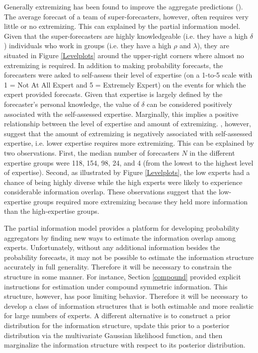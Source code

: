 \documentclass[11pt]{article}
\theoremstyle{definition}
\theoremstyle{definition}
\begin{document}
Generally extremizing has been found to improve the aggregate predictions (\cite{mellers}). The average forecast of a team of super-forecasters, however, often requires very little or no extremizing. This can explained by the partial information model. Given that the  super-forecasters are highly knowledgeable (i.e. they have a high $\delta$) individuals who work in groups (i.e. they have a high $\rho$ and $\lambda$), they are situated in Figure \ref{Levelplots} around the upper-right corners where almost no extremizing is required. In addition to making probability forecasts, the forecasters were asked to self-assess their level of expertise (on a 1-to-5 scale with 1 = Not At All Expert and 5 = Extremely Expert) on the events for which the expert provided forecasts. Given that expertise is largely defined by the forecaster's personal knowledge, the value of $\delta$ can be considered positively associated with the self-assessed expertise. Marginally, this implies a positive relationship between the level of expertise and amount of extremizing. \cite{satopaa}, however, suggest that the amount of extremizing is negatively associated with self-assessed expertise, i.e. lower expertise requires more extremizing. This can be explained by two observations. First, the median number of forecasters $N$ in the different expertise groups were 118, 154,  98,  24, and 4 (from the lowest to the highest level of expertise). Second, as illustrated by Figure \ref{Levelplots}, the low experts had a chance of being highly diverse while the high experts were likely to experience considerable information overlap. These observations suggest that the low-expertise groups required more extremizing because they held more information than the high-expertise groups.


The partial information model provides a platform for developing probability aggregators by finding new ways  to estimate the information overlap among experts. Unfortunately, without any additional information besides the probability forecasts, it may not be possible to estimate the information structure accurately in full generality. Therefore it will be necessary to constrain the structure in some manner. For instance, Section \ref{compound} provided explicit instructions for estimation under compound symmetric information. This structure, however, has poor limiting behavior. Therefore it will be necessary to develop a class of information structures that is  both estimable and more realistic for large numbers of experts.  A different alternative is to construct a prior distribution for the information structure, update this prior to a posterior distribution via the multivariate Gaussian likelihood function, and then marginalize the information structure with respect to its posterior distribution.  
\end{document}

